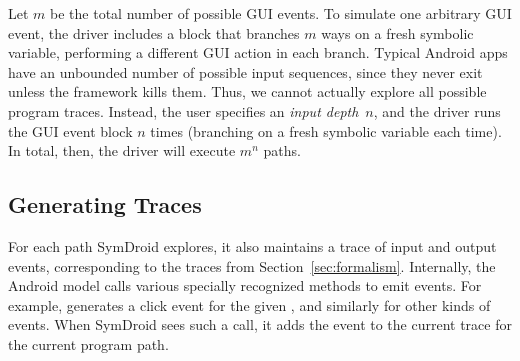 \documentclass[10pt,conference,compsocconf]{IEEEtran}
\newcommand{\code}[1]{\text{\lstinline!#1!}}
\begin{document}

Let $m$ be the total number of possible GUI events.  To simulate one
arbitrary GUI event, the driver includes a block that branches $m$
ways on a fresh symbolic variable, performing a different GUI action
in each branch.  Typical Android apps have an unbounded number of
possible input sequences, since they never exit unless the framework
kills them. Thus, we cannot actually explore all possible program
traces. Instead, the user specifies an \emph{input depth}~$n$, and the
driver runs the GUI event block $n$ times (branching on a fresh
symbolic variable each time). In total, then, the driver will execute
$m^n$ paths.

\subsection{Generating Traces}
\label{sec:symbolic-traces}

For each path SymDroid explores, it also maintains a trace of input
and output events, corresponding to the traces from
Section~\ref{sec:formalism}. Internally, the Android model calls various
specially recognized methods to emit events. For example,
\code{Trace.addClick(id)} generates a click event for the given
\code{id}, and similarly for other kinds of events.
When SymDroid sees such a call, it adds the event to the current trace
for the current program path.

\end{document}

